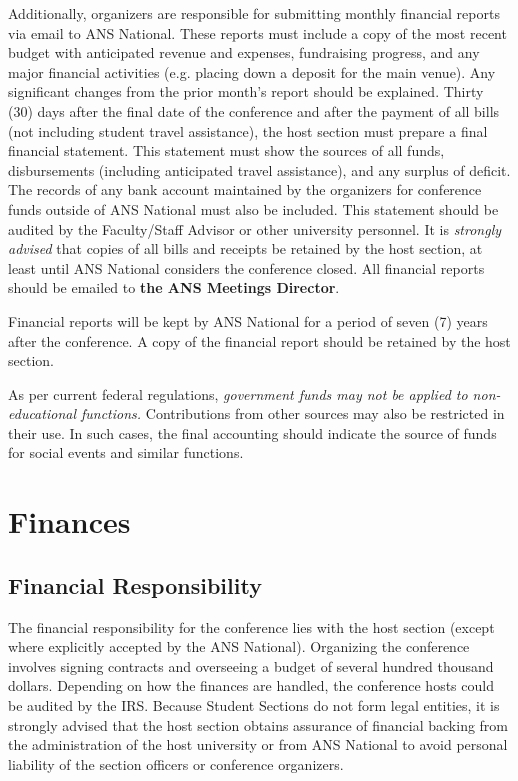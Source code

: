 \documentclass[12pt]{article}
\begin{document}
Additionally, organizers are responsible for submitting monthly financial reports via email to ANS National.
These reports must include a copy of the most recent budget with anticipated revenue and expenses, fundraising progress, and any major financial activities (e.g. placing down a deposit for the main venue).
Any significant changes from the prior month's report should be explained.
Thirty (30) days after the final date of the conference and after the payment of all bills (not including student travel assistance), the host section must prepare a final financial statement.
This statement must show the sources of all funds, disbursements (including anticipated travel assistance), and any surplus of deficit.
The records of any bank account maintained by the organizers for conference funds outside of ANS National must also be included.
This statement should be audited by the Faculty/Staff Advisor or other university personnel.
It is \emph{strongly advised} that copies of all bills and receipts be retained by the host section, at least until ANS National considers the conference closed.
All financial reports should be emailed to \textbf{the ANS Meetings Director}.

Financial reports will be kept by ANS National for a period of seven (7) years after the conference.
A copy of the financial report should be retained by the host section.

As per current federal regulations, \emph{government funds may not be applied to non-educational functions.}
Contributions from other sources may also be restricted in their use.
In such cases, the final accounting should indicate the source of funds for social events and similar functions.

\clearpage

\section{Finances}
\subsection{Financial Responsibility}
The financial responsibility for the conference lies with the host section (except where explicitly accepted by the ANS National).
Organizing the conference involves signing contracts and overseeing a budget of several hundred thousand dollars.
Depending on how the finances are handled, the conference hosts could be audited by the IRS.
Because Student Sections do not form legal entities, it is strongly advised that the host section obtains assurance of financial backing from the administration of the host university or from ANS National to avoid personal liability of the section officers or conference organizers.
\end{document}
